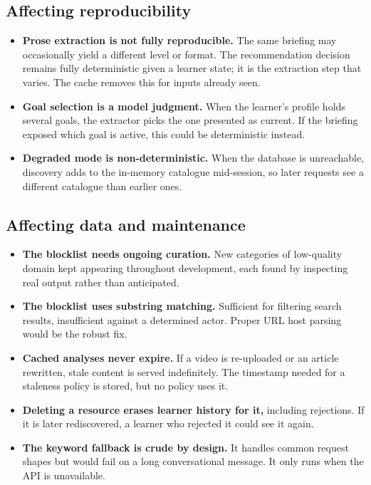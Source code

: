 \documentclass[11pt,a4paper]{article}
\begin{document}
\subsection{Affecting reproducibility}

\begin{itemize}
\item \textbf{Prose extraction is not fully reproducible.} The same briefing
may occasionally yield a different level or format. The recommendation
decision remains fully deterministic given a learner state; it is the
extraction step that varies. The cache removes this for inputs already seen.

\item \textbf{Goal selection is a model judgment.} When the learner's profile
holds several goals, the extractor picks the one presented as current. If the
briefing exposed which goal is active, this could be deterministic instead.

\item \textbf{Degraded mode is non-deterministic.} When the database is
unreachable, discovery adds to the in-memory catalogue mid-session, so later
requests see a different catalogue than earlier ones.
\end{itemize}

\subsection{Affecting data and maintenance}

\begin{itemize}
\item \textbf{The blocklist needs ongoing curation.} New categories of
low-quality domain kept appearing throughout development, each found by
inspecting real output rather than anticipated.

\item \textbf{The blocklist uses substring matching.} Sufficient for filtering
search results, insufficient against a determined actor. Proper URL host
parsing would be the robust fix.

\item \textbf{Cached analyses never expire.} If a video is re-uploaded or an
article rewritten, stale content is served indefinitely. The timestamp needed
for a staleness policy is stored, but no policy uses it.

\item \textbf{Deleting a resource erases learner history for it,} including
rejections. If it is later rediscovered, a learner who rejected it could see
it again.

\item \textbf{The keyword fallback is crude by design.} It handles common
request shapes but would fail on a long conversational message. It only runs
when the API is unavailable.
\end{itemize}
\end{document}
